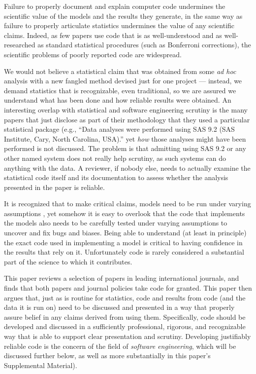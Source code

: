 \documentclass[10pt,letterpaper]{article}
\def\supplement{Supplemental Material}
\begin{document}
Failure to properly document and explain computer code undermines the scientific value of the models and the results they generate, in the same way as failure to properly articulate statistics undermines the value of any scientific claims. Indeed, as few papers use code that is as well-understood and as well-researched as standard statistical procedures (such as Bonferroni corrections), the scientific problems of poorly reported code are widespread. 


We would not believe a statistical claim that was obtained from some \emph{ad hoc\/} analysis with a new fangled method devised just for one project --- instead, we demand statistics that is recognizable, even traditional, so we are assured we understand what has been done and how reliable results were obtained. An interesting overlap with statistical and software engineering scrutiny is the many papers that just disclose as part of their methodology that they used a particular statistical package (e.g., ``Data analyses were performed using SAS 9.2 (SAS Institute, Cary, North Carolina, USA)\@.'' yet \emph{how\/} those analyses might have been performed is not discussed. The problem is that admitting using SAS 9.2 or any other named system does not really help scrutiny, as such systems can do anything with the data. A reviewer, if nobody else, needs to actually examine the statistical code itself and its documentation to assess whether the analysis presented in the paper is reliable. 

It is recognized that to make critical claims, models need to be run under varying assumptions \cite{whitty}, yet somehow it is easy to overlook that the code that implements the models also needs to be carefully tested under varying assumptions to uncover and fix bugs and biases. Being able to understand (at least in principle) the exact code used in implementing a model is critical to having confidence in the results that rely on it. Unfortunately code is rarely considered a substantial part of the science to which it contributes. 

This paper reviews a selection of papers in leading international journals, and finds that both papers and journal policies take code for granted. This paper then argues that, just as is routine for statistics, code and results from code (and the data it is run on) need to be discussed and presented in a way that properly assure belief in any claims derived from using them. Specifically, code should be developed and discussed in a sufficiently professional, rigorous, and recognizable way that is able to support clear presentation and scrutiny. Developing justifiably reliable code is the concern of the field of \emph{software engineering}, which will be discussed further below, as well as more substantially in this paper's \supplement). 
\end{document}
